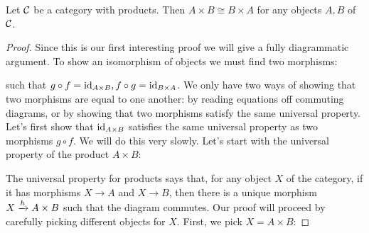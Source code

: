 \begin{proposition} \label{prop:products-commutative}
  Let \(\mathcal C\) be a category with products.
  Then \(A\times B \cong B \times A\)
  for any objects \(A,B\) of \(\mathcal C\).
\end{proposition}
\begin{proof}
  Since this is our first interesting proof we will give a fully diagrammatic argument.
  To show an isomorphism of objects we must find two morphisms:
  
  \begin{center}
  \end{center}
such that $g \circ f = \operatorname{id}_{A \times B}, f \circ g = \operatorname{id}_{B \times A}$.
We only have two ways of showing that two morphisms are equal to one 
another: by reading equations off commuting diagrams, or by showing that 
two morphisms satisfy the same universal property.
Let's first show that $\operatorname{id}_{A \times B}$ satisfies the same universal property
as two morphisms $g \circ f$. 
We will do this very slowly.
Let's start with the universal property of the product $A \times B$:
\begin{center}
\end{center}
The universal property for products says that, for any object $X$ of the
category, if it has morphisms $X \to A$ and $X \to B$, then there is a unique
morphism $X \xrightarrow{h} A \times B$ such that the diagram commutes. 
Our proof will proceed by carefully picking different objects for $X$.
First, we pick $X = A \times B$:


\end{proof}
